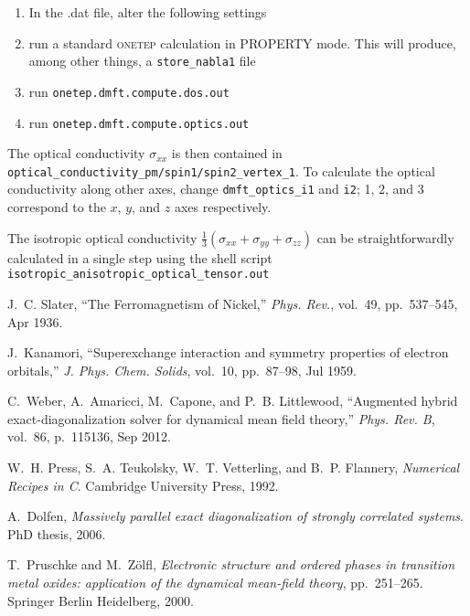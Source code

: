 \documentclass[10pt,a4paper,final]{article}
\begin{document}
\begin{enumerate}
\item In the .dat file, alter the following settings
\item run a standard \textsc{onetep} calculation in PROPERTY mode. This will produce, among other things, a \texttt{store\_nabla1} file
\item run \texttt{onetep.dmft.compute.dos.out}
\item run \texttt{onetep.dmft.compute.optics.out}
\end{enumerate}
    The optical conductivity $\sigma_{xx}$ is then contained in \texttt{optical\_conductivity\_pm/spin1/spin2\_vertex\_1}. To calculate the optical conductivity along other axes, change \texttt{dmft\_optics\_i1} and \texttt{i2}; 1, 2, and 3 correspond to the $x$, $y$, and $z$ axes respectively.

The isotropic optical conductivity $\frac{1}{3}\left(\sigma_{xx} + \sigma_{yy} + \sigma_{zz}\right)$ can be straightforwardly calculated in a single step using the shell script \texttt{isotropic\_anisotropic\_optical\_tensor.out}



\begin{thebibliography}{1}

J.~C. Slater, ``{The Ferromagnetism of Nickel},'' {\em Phys. Rev.}, vol.~49,
  pp.~537--545, Apr 1936.

J.~Kanamori, ``{Superexchange interaction and symmetry properties of electron
  orbitals},'' {\em J. Phys. Chem. Solids}, vol.~10, pp.~87--98, Jul 1959.

C.~Weber, A.~Amaricci, M.~Capone, and P.~B. Littlewood, ``{Augmented hybrid
  exact-diagonalization solver for dynamical mean field theory},'' {\em Phys.
  Rev. B}, vol.~86, p.~115136, Sep 2012.

W.~H. Press, S.~A. Teukolsky, W.~T. Vetterling, and B.~P. Flannery, {\em
  {Numerical Recipes in C}}.
\newblock Cambridge University Press, 1992.

A.~Dolfen, {\em {Massively parallel exact diagonalization of strongly
  correlated systems}}.
\newblock PhD thesis, 2006.

T.~Pruschke and M.~Z{\"o}lfl, {\em {Electronic structure and ordered phases in
  transition metal oxides: application of the dynamical mean-field theory}},
  pp.~251--265.
\newblock Springer Berlin Heidelberg, 2000.

\end{thebibliography}
\end{document}
